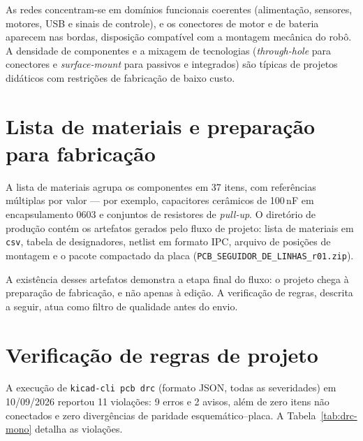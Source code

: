 As redes concentram-se em domínios funcionais coerentes (alimentação,
sensores, motores, USB e sinais de controle), e os conectores de motor e de
bateria aparecem nas bordas, disposição compatível com a montagem mecânica do
robô. A densidade de componentes e a mixagem de tecnologias (\emph{through-hole}
para conectores e \emph{surface-mount} para passivos e integrados) são
típicas de projetos didáticos com restrições de fabricação de baixo custo.

\section{Lista de materiais e preparação para fabricação}

A lista de materiais agrupa os componentes em 37 itens, com referências
múltiplas por valor --- por exemplo, capacitores cerâmicos de 100\,nF em
encapsulamento 0603 e conjuntos de resistores de \emph{pull-up}. O diretório
de produção contém os artefatos gerados pelo fluxo de projeto: lista de
materiais em \texttt{csv}, tabela de designadores, netlist em formato IPC,
arquivo de posições de montagem e o pacote compactado da placa
(\texttt{PCB\_SEGUIDOR\_DE\_LINHAS\_r01.zip}).

A existência desses artefatos demonstra a etapa final do fluxo: o projeto
chega à preparação de fabricação, e não apenas à edição. A verificação de
regras, descrita a seguir, atua como filtro de qualidade antes do envio.

\section{Verificação de regras de projeto}

A execução de \texttt{kicad-cli pcb drc} (formato JSON, todas as severidades)
em 10/09/2026 reportou 11 violações: 9 erros e 2 avisos, além de zero itens
não conectados e zero divergências de paridade esquemático--placa. A
Tabela~\ref{tab:drc-mono} detalha as violações.

